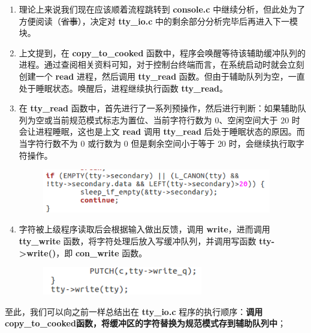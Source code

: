 \begin{enumerate}
\begin{itemize}
                    \end{itemize}
                \item 理论上来说我们现在应该顺着流程跳转到 \textbf{console.c} 中继续分析，但此处为了方便阅读（\sout{省事}），决定对 \textbf{tty\_io.c} 中的剩余部分分析完毕后再进入下一模块。
                \item 上文提到，在 \textbf{copy\_to\_cooked} 函数中，程序会唤醒等待该辅助缓冲队列的进程。通过查阅相关资料可知，对于控制台终端而言，在系统启动时就会立刻创建一个 \textbf{read} 进程，然后调用 \textbf{tty\_read} 函数。但由于辅助队列为空，一直处于睡眠状态。唤醒后，进程继续执行函数 \textbf{tty\_read}。
                \item 在 \textbf{tty\_read} 函数中，首先进行了一系列预操作，然后进行判断：如果辅助队列为空或当前规范模式标志为置位、当前字符行数为 $0$、空闲空间大于 $20$ 时会让进程睡眠，这也是上文 \textbf{read} 调用 \textbf{tty\_read} 后处于睡眠状态的原因。而当字符行数不为 $0$ 或行数为 $0$ 但是剩余空间小于等于 $20$ 时，会继续执行取字符操作。
                    \begin{figure}[htbp]
                        \hspace*{1.5cm}
                        \includegraphics*[width = 10cm]{s1_5.png}
                    \end{figure}
                \item 字符被上级程序读取后会根据输入做出反馈，调用 \textbf{write}，进而调用 \textbf{tty\_write} 函数，将字符处理后放入写缓冲队列，并调用写函数 \textbf{tty->write()}，即 \textbf{con\_write} 函数。   
                    \begin{figure}[htbp]
                        \hspace*{1.5cm}
                        \includegraphics*[width = 7cm]{s1_6.png}
                    \end{figure}
            \end{enumerate}
            \par 至此，我们可以向之前一样总结出在 \textbf{tty\_io.c} 程序的执行顺序：\textbf{调用 copy\_to\_cooked函数，将缓冲区的字符替换为规范模式存到辅助队列中}；
